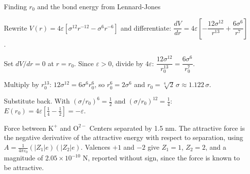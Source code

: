 \documentclass[11pt]{article}
\begin{document}
\begin{method}{Finding $r_0$ and the bond energy from Lennard-Jones}
\begin{steps}
\item Rewrite $V(r) = 4\varepsilon[\sigma^{12}r^{-12} - \sigma^{6}r^{-6}]$ and
differentiate:
$\dfrac{dV}{dr} = 4\varepsilon\left[-\dfrac{12\sigma^{12}}{r^{13}}
+ \dfrac{6\sigma^{6}}{r^{7}}\right]$.
\item Set $dV/dr = 0$ at $r=r_0$. Since $\varepsilon>0$, divide by $4\varepsilon$:
$\dfrac{12\sigma^{12}}{r_0^{13}} = \dfrac{6\sigma^{6}}{r_0^{7}}$.
\item Multiply by $r_0^{13}$: $12\sigma^{12} = 6\sigma^{6}r_0^{6}$, so
$r_0^{6} = 2\sigma^{6}$ and $r_0 = \sqrt[6]{2}\,\sigma \approx 1.122\,\sigma$.
\item Substitute back. With $(\sigma/r_0)^6 = \tfrac{1}{2}$ and
$(\sigma/r_0)^{12} = \tfrac{1}{4}$:
$E(r_0) = 4\varepsilon\left[\tfrac{1}{4}-\tfrac{1}{2}\right] = -\varepsilon$.
\end{steps}
\end{method}

\begin{worked}{Force between $\mathrm{K}^{+}$ and $\mathrm{O}^{2-}$}
Centers separated by 1.5 nm. The attractive force is the negative derivative of
the attractive energy with respect to separation, using
$A=\frac{1}{4\pi\varepsilon_0}(|Z_1|e)(|Z_2|e)$. Valences $+1$ and $-2$ give
$Z_1=1$, $Z_2=2$, and a magnitude of $2.05\times10^{-10}$ N, reported without
sign, since the force is known to be attractive.
\end{worked}
\end{document}

